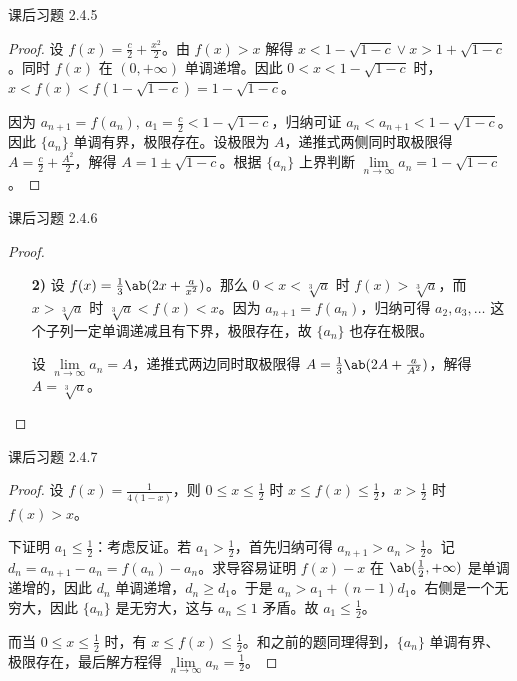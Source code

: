 \begin{problem}
	课后习题 2.4.5

	\begin{proof}
		设 $f(x) = \frac{c}{2} + \frac{x^2}{2}$。由 $f(x) > x$ 解得 $x < 1 - \sqrt{1 - c} \lor x > 1 + \sqrt{1 - c}$。同时 $f(x)$ 在 $(0, +\infty)$ 单调递增。因此 $0 < x < 1 - \sqrt{1 - c}$ 时，$x < f(x) < f(1 - \sqrt{1 - c}) = 1 - \sqrt{1 - c}$。

		因为 $a_{n+1} = f(a_n),\ a_1 = \frac{c}{2} < 1 - \sqrt{1 - c}$，归纳可证 $a_n < a_{n+1} < 1 - \sqrt{1 - c}$。因此 $\{a_n\}$ 单调有界，极限存在。设极限为 $A$，递推式两侧同时取极限得 $A = \frac{c}{2} + \frac{A^2}{2}$，解得 $A = 1 \pm \sqrt{1 - c}$。根据 $\{a_n\}$ 上界判断 $\lim\limits_{n \to \infty} a_n = 1 - \sqrt{1 - c}$。
	\end{proof}
\end{problem}

\begin{problem}
	课后习题 2.4.6
	
	\begin{proof}
		\begin{enumerate}
			\item[\textbf{2)}] 设 $f(x) = \frac{1}{3}\ab(2x + \frac{a}{x^2})$。那么 $0 < x < \sqrt[3]{a}$ 时 $f(x) > \sqrt[3]{a}$，而 $x > \sqrt[3]{a}$ 时 $\sqrt[3]{a} < f(x) < x$。因为 $a_{n+1} = f(a_n)$，归纳可得 $a_2, a_3, \dots$ 这个子列一定单调递减且有下界，极限存在，故 $\{a_n\}$ 也存在极限。
			
			设 $\lim\limits_{n \to \infty} a_n = A$，递推式两边同时取极限得 $A = \frac{1}{3} \ab(2A + \frac{a}{A^2})$，解得 $A = \sqrt[3]{a}$。
		\end{enumerate}
	\end{proof}
\end{problem}

\begin{problem}
	课后习题 2.4.7

	\begin{proof}
		设 $f(x) = \frac{1}{4(1 - x)}$，则 $0 \le x \le \frac{1}{2}$ 时 $x \le f(x) \le \frac{1}{2}$，$x > \frac{1}{2}$ 时 $f(x) > x$。

		下证明 $a_1 \le \frac{1}{2}$：考虑反证。若 $a_1 > \frac{1}{2}$，首先归纳可得 $a_{n+1} > a_n > \frac{1}{2}$。记 $d_n = a_{n+1} - a_n = f(a_{n}) - a_n$。求导容易证明 $f(x) - x$ 在 $\ab(\frac{1}{2}, +\infty)$ 是单调递增的，因此 $d_n$ 单调递增，$d_n \ge d_1$。于是 $a_n > a_1 + (n - 1)d_1$。右侧是一个无穷大，因此 $\{a_n\}$ 是无穷大，这与 $a_n \le 1$ 矛盾。故 $a_1 \le \frac{1}{2}$。

		而当 $0 \le x \le \frac{1}{2}$ 时，有 $x \le f(x) \le \frac{1}{2}$。和之前的题同理得到，$\{a_n\}$ 单调有界、极限存在，最后解方程得 $\lim\limits_{n \to \infty} a_n = \frac{1}{2}$。
	\end{proof}
\end{problem}